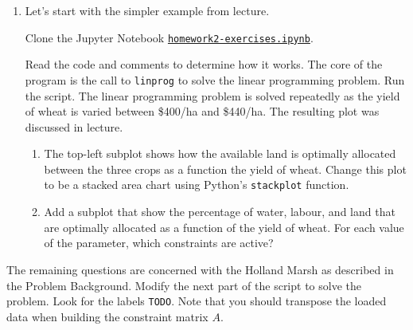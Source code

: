 \documentclass[letter]{article}
\begin{document}
\begin{enumerate}[label=\textbf{\arabic*.}]
	\item Let's start with the simpler example from lecture.%

	Clone the Jupyter Notebook \href{https://utoronto.syzygy.ca/jupyter/user-redirect/git-pull?repo=https://github.com/bigfatbernie/IBLMathModeling&subPath=homeworks/homework2/homework2-exercises.ipynb}{\tt homework2-exercises.ipynb}.
	
	Read the code and comments to determine how it works. The core of the program is the call to \verb|linprog| to solve the linear programming problem. Run the script. The linear programming problem is solved repeatedly as the yield of wheat is varied between \$400/ha and \$440/ha. The resulting plot was discussed in lecture. 
	
	\begin{enumerate}
	
	\item The top-left subplot shows how the available land is optimally allocated between the three crops as a function the yield of wheat. Change this plot to be a stacked area chart using Python's \verb|stackplot| function. 
	
	\item Add a subplot that show the percentage of water, labour, and land that are optimally allocated as a function of the yield of wheat. For each value of the parameter, which constraints are active? 
	\end{enumerate}
\end{enumerate}

The remaining questions are concerned with the Holland Marsh as described in the Problem Background. 
	Modify the next part of the script to solve the problem. Look for the labels \verb|TODO|. 
	Note that you should transpose the loaded data when building the constraint matrix $A$.
\end{document}
